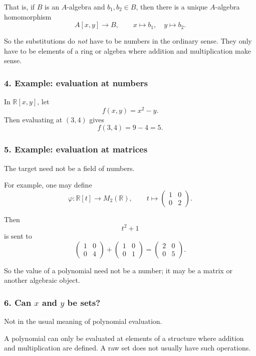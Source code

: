 \documentclass[12pt,a4paper]{article}
\theoremstyle{plain}
\theoremstyle{definition}      %
\begin{document}
	That is, if \(B\) is an \(A\)-algebra and \(b_1,b_2\in B\), then there is a unique \(A\)-algebra homomorphism
	\[
	A[x,y]\to B,
	\qquad
	x\mapsto b_1,\quad y\mapsto b_2.
	\]
	
	So the substitutions do \emph{not} have to be numbers in the ordinary sense.
	They only have to be elements of a ring or algebra where addition and multiplication make sense.
	
	\subsubsection*{4. Example: evaluation at numbers}
	
	In \(\mathbb R[x,y]\), let
	\[
	f(x,y)=x^2-y.
	\]
	Then evaluating at \((3,4)\) gives
	\[
	f(3,4)=9-4=5.
	\]
	
	\subsubsection*{5. Example: evaluation at matrices}
	
	The target need not be a field of numbers.
	
	For example, one may define
	\[
	\varphi:\mathbb R[t]\to M_2(\mathbb R),
	\qquad
	t\mapsto
	\begin{pmatrix}
		1&0\\
		0&2
	\end{pmatrix}.
	\]
	
	Then
	\[
	t^2+1
	\]
	is sent to
	\[
	\begin{pmatrix}
		1&0\\
		0&4
	\end{pmatrix}
	+
	\begin{pmatrix}
		1&0\\
		0&1
	\end{pmatrix}
	=
	\begin{pmatrix}
		2&0\\
		0&5
	\end{pmatrix}.
	\]
	
	So the value of a polynomial need not be a number; it may be a matrix or another algebraic object.
	
	\subsubsection*{6. Can \(x\) and \(y\) be sets?}
	
	Not in the usual meaning of polynomial evaluation.
	
	A polynomial can only be evaluated at elements of a structure where addition and multiplication are defined.
	A raw set does not usually have such operations.
	
\end{document}

